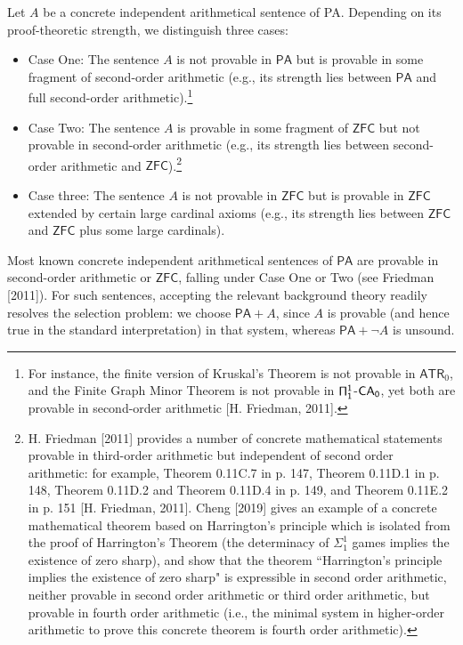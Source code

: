 \documentclass[a4paper,12pt]{amsart}
\theoremstyle{definition}
\numberwithin{equation}{section}
\begin{document}
Let $A$ be a concrete independent arithmetical sentence of {\sf PA}. Depending on its proof-theoretic strength, we distinguish three cases:
\begin{itemize}
 \item Case One: The  sentence $A$ is not provable in $\mathsf{PA}$ but is provable in some fragment of second-order arithmetic (e.g., its strength lies between $\mathsf{PA}$ and full second-order arithmetic).\footnote{For instance, the finite version of Kruskal's Theorem is not provable in $\mathsf{ATR}_0$, and the Finite Graph Minor Theorem is not provable in ${\sf \Pi^1_1}$-${\sf CA_0}$, yet both are provable in second-order arithmetic [H. Friedman, 2011].}
\item Case Two: The  sentence $A$ is provable in some fragment of $\mathsf{ZFC}$ but not provable in second-order arithmetic (e.g., its strength lies between second-order arithmetic and $\mathsf{ZFC}$).\footnote{H. Friedman [2011] provides a number of concrete mathematical statements provable in third-order arithmetic but independent of second order arithmetic: for example, Theorem 0.11C.7 in p. 147, Theorem 0.11D.1 in p. 148, Theorem 0.11D.2 and Theorem 0.11D.4 in p. 149,  and Theorem 0.11E.2 in p. 151 [H. Friedman, 2011]. Cheng [2019] gives an example of a concrete mathematical theorem based on Harrington's principle which is isolated from the proof of Harrington's Theorem (the determinacy of $\Sigma^1_1$ games implies the existence of zero sharp), and show that the theorem ``Harrington's principle implies the existence of zero sharp" is  expressible in second order arithmetic, neither provable in  second order arithmetic or third order arithmetic, but provable in fourth order arithmetic (i.e., the minimal system in higher-order arithmetic to prove this concrete theorem is fourth order arithmetic).} 
\item Case three: The  sentence $A$ is not provable in $\mathsf{ZFC}$ but is provable in $\mathsf{ZFC}$ extended by certain large cardinal axioms (e.g., its strength lies between $\mathsf{ZFC}$ and $\mathsf{ZFC}$ plus some large cardinals).
\end{itemize}

Most known concrete independent arithmetical sentences of \(\mathsf{PA}\) are provable in second-order arithmetic or \(\mathsf{ZFC}\), falling under Case One or Two (see Friedman [2011]). For such sentences, accepting the relevant background theory readily resolves the selection problem: we choose \(\mathsf{PA}+A\), since \(A\) is provable (and hence true in the standard interpretation) in that system, whereas \(\mathsf{PA}+\neg A\) is unsound.
 
\end{document}
